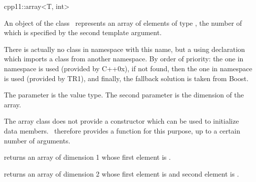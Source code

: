 

\begin{ccRefClass}{cpp11::array<T, int>}

\ccDefinition

An object of the class \ccClassTemplateName\ represents an array of elements
of type , the number of which is specified by the second template argument.

There is actually no class in namespace  with this name, but a using declaration which
imports a class from another namespace.  By order of priority: the one in namespace
 is used (provided by C++0x), if not found, then the one in namespace
 is used (provided by TR1), and finally, the fallback solution 
is taken from Boost.


  \ccParameters

  The parameter  is the value type.  The second parameter is the
  dimension of the array.


  The array class does not provide a constructor which can be used to initialize
  data members.  \cgal\ therefore provides a  function for
  this purpose, up to a certain number of arguments.

  \def\ccTagRmEigenClassName{\ccFalse}
  {returns an array of dimension 1 whose first element is .}

  {returns an array of dimension 2 whose first element is 
   and second element is .}

\end{ccRefClass}

\ccParDims
